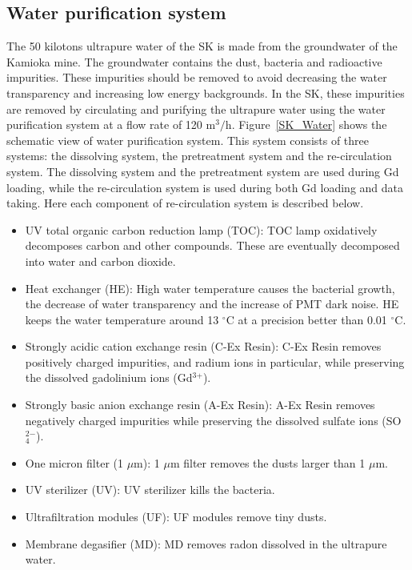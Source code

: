 \subsection{Water purification system}
\vs\hs The 50 kilotons ultrapure water of the SK is made from the groundwater of the Kamioka mine.
The groundwater contains the dust, bacteria and radioactive impurities.
These impurities should be removed to avoid decreasing the water transparency and increasing low energy backgrounds.
In the SK, these impurities are removed by circulating and purifying the ultrapure water using the water purification system at a flow rate of 120 m$^{\text{3}}/$h.
Figure~\ref{SK_Water} shows the schematic view of water purification system.
This system consists of three systems: the dissolving system, the pretreatment system and the re-circulation system.
The dissolving system and the pretreatment system are used during Gd loading, while the re-circulation system is used during both Gd loading and data taking.
Here each component of re-circulation system is described below.
\begin{itemize}
	\item UV total organic carbon reduction lamp (TOC): TOC lamp oxidatively decomposes carbon and other compounds. These are eventually decomposed into water and carbon dioxide.
	\item Heat exchanger (HE): High water temperature causes the bacterial growth, the decrease of water transparency and the increase of PMT dark noise. HE keeps the water temperature around 13 $^{\circ}$C at a precision better than 0.01 $^{\circ}$C.
	\item Strongly acidic cation exchange resin (C-Ex Resin): C-Ex Resin removes positively charged impurities, and radium ions in particular, while preserving the dissolved gadolinium ions (Gd$^{\text{3}+}$).
	\item Strongly basic anion exchange resin (A-Ex Resin): A-Ex Resin removes negatively charged impurities while preserving the dissolved sulfate ions (SO$^{\text{2}-}_{\text{4}}$).
	\item One micron filter (1 $\mu$m): 1 $\mu$m filter removes the dusts larger than 1 $\mu$m.
	\item UV sterilizer (UV): UV sterilizer kills the bacteria.
	\item Ultrafiltration modules (UF): UF modules remove tiny dusts.
	\item Membrane degasifier (MD): MD removes radon dissolved in the ultrapure water.
\end{itemize}

